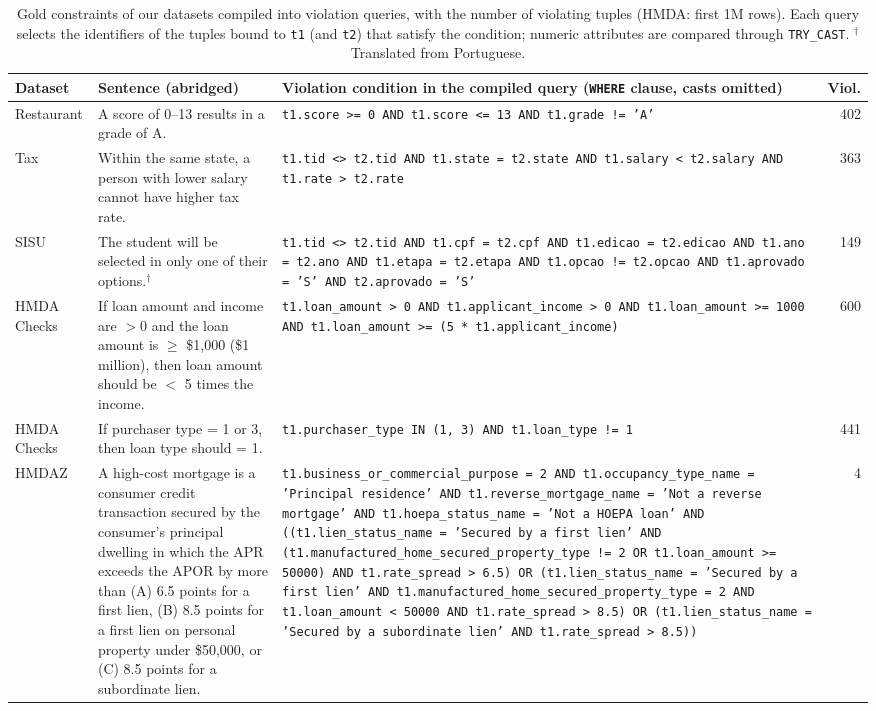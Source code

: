 \begin{table}[t]
  \centering
  \caption{Gold constraints of our datasets compiled into violation queries, with the number of violating tuples (HMDA: first 1M rows). Each query selects the identifiers of the tuples bound to \texttt{t1} (and \texttt{t2}) that satisfy the condition; numeric attributes are compared through \texttt{TRY\_CAST}. $^{\dagger}$Translated from Portuguese.}
  \label{tab:sql-examples}
  \footnotesize
  \setlength{\tabcolsep}{4pt}
  \begin{tabular}{>{\raggedright\arraybackslash}p{1.6cm}>{\raggedright\arraybackslash}p{4.6cm}>{\raggedright\arraybackslash}p{9.0cm}r}
    \toprule
    \textbf{Dataset} & \textbf{Sentence (abridged)} & \textbf{Violation condition in the compiled query (\texttt{WHERE} clause, casts omitted)} & \textbf{Viol.} \\
    \midrule
    Restaurant & A score of 0--13 results in a grade of A. & \texttt{t1.score >= 0 AND t1.score <= 13 AND t1.grade != 'A'} & 402 \\
    Tax & Within the same state, a person with lower salary cannot have higher tax rate. & \texttt{t1.tid <> t2.tid AND t1.state = t2.state AND t1.salary < t2.salary AND t1.rate > t2.rate} & 363 \\
    SISU & The student will be selected in only one of their options.$^{\dagger}$ & \texttt{t1.tid <> t2.tid AND t1.cpf = t2.cpf AND t1.edicao = t2.edicao AND t1.ano = t2.ano AND t1.etapa = t2.etapa AND t1.opcao != t2.opcao AND t1.aprovado = 'S' AND t2.aprovado = 'S'} & 149 \\
    HMDA Checks & If loan amount and income are $>0$ and the loan amount is $\geq$ \$1,000 (\$1 million), then loan amount should be $<$ 5 times the income. & \texttt{t1.loan\_amount > 0 AND t1.applicant\_income > 0 AND t1.loan\_amount >= 1000 AND t1.loan\_amount >= (5 * t1.applicant\_income)} & 600 \\
    HMDA Checks & If purchaser type = 1 or 3, then loan type should = 1. & \texttt{t1.purchaser\_type IN (1, 3) AND t1.loan\_type != 1} & 441 \\
    HMDAZ & A high-cost mortgage is a consumer credit transaction secured by the consumer's principal dwelling in which the APR exceeds the APOR by more than (A) 6.5 points for a first lien, (B) 8.5 points for a first lien on personal property under \$50,000, or (C) 8.5 points for a subordinate lien. & \texttt{t1.business\_or\_commercial\_purpose = 2 AND t1.occupancy\_type\_name = 'Principal residence' AND t1.reverse\_mortgage\_name = 'Not a reverse mortgage' AND t1.hoepa\_status\_name = 'Not a HOEPA loan' AND ((t1.lien\_status\_name = 'Secured by a first lien' AND (t1.manufactured\_home\_secured\_property\_type != 2 OR t1.loan\_amount >= 50000) AND t1.rate\_spread > 6.5) OR (t1.lien\_status\_name = 'Secured by a first lien' AND t1.manufactured\_home\_secured\_property\_type = 2 AND t1.loan\_amount < 50000 AND t1.rate\_spread > 8.5) OR (t1.lien\_status\_name = 'Secured by a subordinate lien' AND t1.rate\_spread > 8.5))} & 4 \\
    \bottomrule
  \end{tabular}
\end{table}

